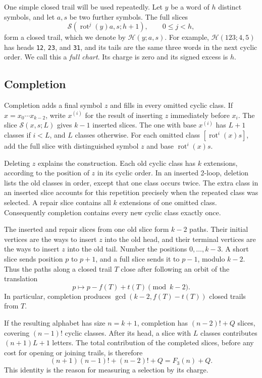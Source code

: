 \documentclass[11pt]{article}
\newcommand{\F}{F_3}
\newcommand{\Slice}{\mathcal S}
\newcommand{\Chart}{\mathcal H}
\newcommand{\word}[1]{\texttt{#1}}
\DeclareMathOperator{\rot}{rot}
\begin{document}
One simple closed trail will be used repeatedly. Let $y$ be a word of
$h$ distinct symbols, and let $a,s$ be two further symbols. The full slices
\[
 \Slice(\rot^j(y)a,s;h+1),\qquad 0\le j<h,
\]
form a closed trail, which we denote by $\Chart(y;a,s)$. For example,
$\Chart(123;4,5)$ has heads \word{12}, \word{23}, and \word{31}, and
its tails are the same three words in the next cyclic order. We call this
a \emph{full chart}. Its charge is zero and its signed excess is $h$.

\subsection{Completion}

Completion adds a final symbol $z$ and fills in every omitted cyclic
class. If $x=x_0\cdots x_{k-2}$, write $x^{(i)}$ for the result of
inserting $z$ immediately before $x_i$. The slice $\Slice(x,s;L)$ gives
$k-1$ inserted slices. The one with base $x^{(i)}$ has $L+1$ classes if
$i<L$, and $L$ classes otherwise. For each omitted class
$[\rot^i(x)s]$, add the full slice with distinguished symbol $z$ and base
$\rot^i(x)s$.

Deleting $z$ explains the construction. Each old cyclic class has $k$
extensions, according to the position of $z$ in its cyclic order. In an
inserted 2-loop, deletion lists the old classes in order, except that one
class occurs twice. The extra class in an inserted slice accounts for this
repetition precisely when the repeated class was selected. A repair slice
contains all $k$ extensions of one omitted class. Consequently completion
contains every new cyclic class exactly once.

The inserted and repair slices from one old slice form $k-2$ paths.
Their initial vertices are the ways to insert $z$ into the old head, and
their terminal vertices are the ways to insert $z$ into the old tail.
Number the positions $0,\ldots,k-3$. A short slice sends position $p$ to
$p+1$, and a full slice sends it to $p-1$, modulo $k-2$. Thus the paths
along a closed trail $T$ close after following an orbit of the translation
\[
 p\longmapsto p-f(T)+t(T)\pmod{k-2}.
\]
In particular, completion produces $\gcd(k-2,f(T)-t(T))$ closed trails
from $T$.

If the resulting alphabet has size $n=k+1$, completion has
$(n-2)!+Q$ slices, covering $(n-1)!$ cyclic classes. After its head, a
slice with $L$ classes contributes $(n+1)L+1$ letters. The total
contribution of the completed slices, before any cost for opening or
joining trails, is therefore
\begin{equation}\label{eq-slice-cost}
 (n+1)(n-1)!+(n-2)!+Q=\F(n)+Q.
\end{equation}
This identity is the reason for measuring a selection by its charge.
\end{document}
